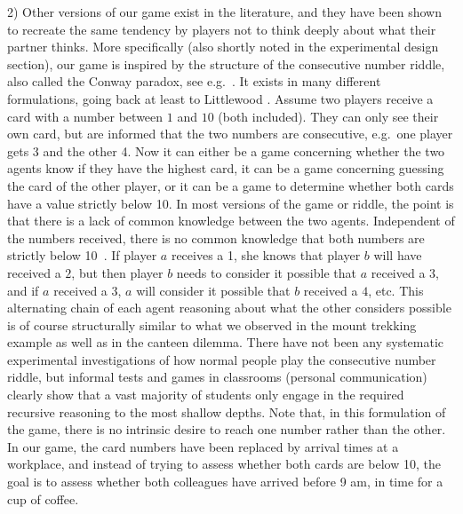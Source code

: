 \documentclass[a4paper]{article}
\newenvironment{robin}{\smallskip \noindent \color{red!10!green!50!blue}}{\color{black}\smallskip}
\begin{document}
\begin{itemize}
\begin{robin}
2) Other versions of our game exist in the literature, and they have been shown to recreate the same tendency by players not to think deeply about what their partner thinks. More specifically (also shortly noted in the experimental design section), our game is inspired by the structure of the consecutive number riddle, also called the Conway paradox, see e.g.~\cite{van1980conway, van2015one}. It exists in many different formulations, going back at least to Littlewood \cite{littlewood1953mathematician}. Assume two players receive a card with a number between $1$ and $10$ (both included). They can only see their own card, but are informed that the two numbers are consecutive, e.g.\ one player gets 3 and the other 4. Now it can either be a game concerning whether the two agents know if they have the highest card, it can be a game concerning guessing the card of the other player, or it can be a game to determine whether both cards have a value strictly below 10. In most versions of the game or riddle, the point is that there is a lack of common knowledge between the two agents. Independent of the numbers received, there is no common knowledge that both numbers are strictly below 10~\cite{ditmarsch2008dynamic}. If player $a$ receives a 1, she knows that player $b$ will have received a $2$, but then player $b$ needs to consider it possible that $a$ received a $3$, and if $a$ received a $3$, $a$ will consider it possible that $b$ received a $4$, etc. This alternating chain of each agent reasoning about what the other considers possible is of course structurally similar to what we observed in the mount trekking example as well as in the canteen dilemma. There have not been any systematic experimental investigations of how normal people play the consecutive number riddle, but informal tests and games in classrooms (personal communication) clearly show that a vast majority of students only engage in the required recursive reasoning to the most shallow depths. Note that, in this formulation of the game, there is no intrinsic desire to reach one number rather than the other. In our game, the card numbers have been replaced by arrival times at a workplace, and instead of trying to assess whether both cards are below 10, the goal is to assess whether both colleagues have arrived before 9 am, in time for a cup of coffee.
\end{robin}


\end{itemize}
\end{document}

